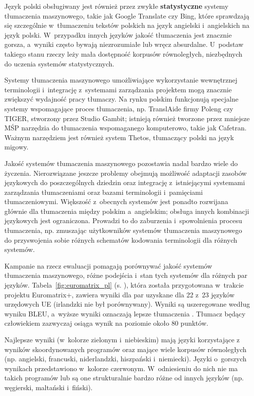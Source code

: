 \begin{multicols}{2}
Język polski obsługiwany jest również przez zwykłe
\textbf{statystyczne} systemy tłumaczenia maszynowego, takie jak
Google Translate czy Bing, które sprawdzają się szczególnie
w~tłumaczeniu tekstów polskich na język angielski i~angielskich na
język polski. W~przypadku innych języków jakość tłumaczenia jest
znacznie gorsza, a~wyniki często bywają niezrozumiałe lub wręcz
absurdalne. U~podstaw takiego stanu rzeczy leży mała dostępność
korpusów równoległych, niezbędnych do uczenia systemów
statystycznych. 

Systemy tłumaczenia maszynowego umożliwiające wykorzystanie
wewnętrznej terminologii i~integrację z~systemami zarządzania
projektem mogą znacznie zwiększyć wydajność pracy tłumaczy. Na
rynku polskim funkcjonują specjalne systemy wspomagające proces
tłumaczenia, np. TranslAide firmy Poleng czy TIGER, stworzony przez
Studio Gambit; istnieją również tworzone przez mniejsze MŚP
narzędzia do tłumaczenia wspomaganego komputerowo, takie jak
Cafetran. Ważnym narzędziem jest również system Thetos,
tłumaczący polski na język migowy. 

Jakość systemów tłumaczenia maszynowego pozostawia nadal bardzo
wiele do życzenia. Nierozwiązane jeszcze problemy obejmują
możliwość adaptacji zasobów językowych do poszczególnych
dziedzin oraz integrację z~istniejącymi systemami zarządzania
tłumaczeniami oraz bazami terminologii i~pamięciami
tłumaczeniowymi. Większość z~obecnych systemów jest ponadto
rozwijana głównie dla tłumaczenia między polskim a~angielskim;
obsługa innych kombinacji językowych jest ograniczona. Prowadzi to
do zaburzenia i~spowolnienia procesu tłumaczenia, np. zmuszając
użytkowników systemów tłumaczenia maszynowego do przyswojenia
sobie różnych schematów kodowania terminologii dla różnych
systemów. 

Kampanie na rzecz ewaluacji pomagają porównywać jakość systemów
tłumaczenia maszynowego, różne podejścia i~stan tych systemów dla
różnych par języków. Tabela~\ref{fig:euromatrix_pl} (s.
\pageref{fig:euromatrix_pl}), która została przygotowana w~trakcie
projektu Euromatrix+, zawiera wyniki dla par uzyskane dla 22 z~23
języków urzędowych UE (irlandzki nie był porównywany). Wyniki są
uszeregowane według wyniku BLEU, a~wyższe wyniki oznaczają lepsze
tłumaczenia \cite{bleu1}. Tłumacz będący człowiekiem zazwyczaj
osiąga wynik na poziomie około 80 punktów. 

Najlepsze wyniki (w~kolorze zielonym i~niebieskim) mają języki
korzystające z wyników skoordynowanych
programów oraz mające wiele korpusów równoległych (np. angielski,
francuski, niderlandzki, hiszpański i~niemiecki). Języki o~gorszych
wynikach przedstawiono w~kolorze czerwonym. W~odniesieniu do nich nie
ma takich programów lub są one strukturalnie bardzo różne od
innych języków (np. węgierski, maltański i~fiński). 


\end{multicols}
